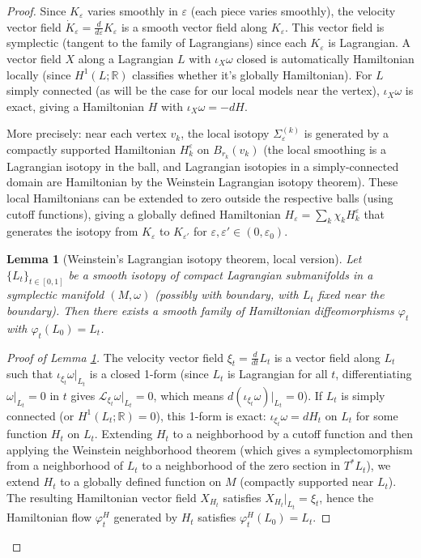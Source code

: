 \documentclass[12pt]{article}
\newtheorem{lemma}[theorem]{Lemma}
\newcommand{\bR}{\mathbb{R}}
\newcommand{\eps}{\varepsilon}
\newcommand{\om}{\omega}
\begin{document}
\begin{proof}
Since $K_\eps$ varies smoothly in $\eps$ (each piece varies smoothly), the velocity vector field $\dot K_\eps = \frac{d}{d\eps}K_\eps$ is a smooth vector field along $K_\eps$. This vector field is symplectic (tangent to the family of Lagrangians) since each $K_\eps$ is Lagrangian. A vector field $X$ along a Lagrangian $L$ with $\iota_X \om$ closed is automatically Hamiltonian locally (since $H^1(L;\bR)$ classifies whether it's globally Hamiltonian). For $L$ simply connected (as will be the case for our local models near the vertex), $\iota_X \om$ is exact, giving a Hamiltonian $H$ with $\iota_{X}\om = -dH$.

More precisely: near each vertex $v_k$, the local isotopy $\Sigma_\eps^{(k)}$ is generated by a compactly supported Hamiltonian $H_k^\eps$ on $B_{r_k}(v_k)$ (the local smoothing is a Lagrangian isotopy in the ball, and Lagrangian isotopies in a simply-connected domain are Hamiltonian by the Weinstein Lagrangian isotopy theorem). These local Hamiltonians can be extended to zero outside the respective balls (using cutoff functions), giving a globally defined Hamiltonian $H_\eps = \sum_k \chi_k H_k^\eps$ that generates the isotopy from $K_\eps$ to $K_{\eps'}$ for $\eps, \eps' \in (0, \eps_0)$.

\begin{lemma}[Weinstein's Lagrangian isotopy theorem, local version]
\label{lem:weinstein-lag-isotopy}
Let $\{L_t\}_{t \in [0,1]}$ be a smooth isotopy of compact Lagrangian submanifolds in a symplectic manifold $(M, \om)$ (possibly with boundary, with $L_t$ fixed near the boundary). Then there exists a smooth family of Hamiltonian diffeomorphisms $\varphi_t$ with $\varphi_t(L_0) = L_t$.
\end{lemma}

\begin{proof}[Proof of Lemma \ref{lem:weinstein-lag-isotopy}]
The velocity vector field $\xi_t = \frac{d}{dt}L_t$ is a vector field along $L_t$ such that $\iota_{\xi_t}\om|_{L_t}$ is a closed 1-form (since $L_t$ is Lagrangian for all $t$, differentiating $\om|_{L_t} = 0$ in $t$ gives $\mathcal{L}_{\xi_t}\om|_{L_t} = 0$, which means $d(\iota_{\xi_t}\om)|_{L_t} = 0$). If $L_t$ is simply connected (or $H^1(L_t;\bR) = 0$), this 1-form is exact: $\iota_{\xi_t}\om = dH_t$ on $L_t$ for some function $H_t$ on $L_t$. Extending $H_t$ to a neighborhood by a cutoff function and then applying the Weinstein neighborhood theorem (which gives a symplectomorphism from a neighborhood of $L_t$ to a neighborhood of the zero section in $T^*L_t$), we extend $H_t$ to a globally defined function on $M$ (compactly supported near $L_t$). The resulting Hamiltonian vector field $X_{H_t}$ satisfies $X_{H_t}|_{L_t} = \xi_t$, hence the Hamiltonian flow $\varphi_t^{H}$ generated by $H_t$ satisfies $\varphi_t^H(L_0) = L_t$.


\end{proof}
\end{proof}
\end{document}
